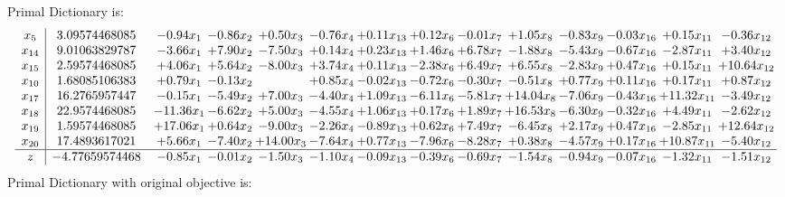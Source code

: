 \documentclass[8pt]{article}
\begin{document}
Primal Dictionary is:
\[\begin{array}{c| c c@{\hskip 2pt} c@{\hskip 2pt} c@{\hskip 2pt} c@{\hskip 2pt} c@{\hskip 2pt} c@{\hskip 2pt} c@{\hskip 2pt} c@{\hskip 2pt} c@{\hskip 2pt} c@{\hskip 2pt} c@{\hskip 2pt} c@{\hskip 2pt} }
 x_{5}   &  3.09574468085 & -0.94 x_{1} & -0.86 x_{2} & +  0.50 x_{3} & -0.76 x_{4} & +  0.11 x_{13} & +  0.12 x_{6} & -0.01 x_{7} & +  1.05 x_{8} & -0.83 x_{9} & -0.03 x_{16} & +  0.15 x_{11} & -0.36 x_{12}\\
 x_{14}   &  9.01063829787 & -3.66 x_{1} & +  7.90 x_{2} & -7.50 x_{3} & +  0.14 x_{4} & +  0.23 x_{13} & +  1.46 x_{6} & +  6.78 x_{7} & -1.88 x_{8} & -5.43 x_{9} & -0.67 x_{16} & -2.87 x_{11} & +  3.40 x_{12}\\
 x_{15}   &  2.59574468085 & +  4.06 x_{1} & +  5.64 x_{2} & -8.00 x_{3} & +  3.74 x_{4} & +  0.11 x_{13} & -2.38 x_{6} & +  6.49 x_{7} & +  6.55 x_{8} & -2.83 x_{9} & +  0.47 x_{16} & +  0.15 x_{11} & + 10.64 x_{12}\\
 x_{10}   &  1.68085106383 & +  0.79 x_{1} & -0.13 x_{2} &   & +  0.85 x_{4} & -0.02 x_{13} & -0.72 x_{6} & -0.30 x_{7} & -0.51 x_{8} & +  0.77 x_{9} & +  0.11 x_{16} & +  0.17 x_{11} & +  0.87 x_{12}\\
 x_{17}   &  16.2765957447 & -0.15 x_{1} & -5.49 x_{2} & +  7.00 x_{3} & -4.40 x_{4} & +  1.09 x_{13} & -6.11 x_{6} & -5.81 x_{7} & + 14.04 x_{8} & -7.06 x_{9} & -0.43 x_{16} & + 11.32 x_{11} & -3.49 x_{12}\\
 x_{18}   &  22.9574468085 & -11.36 x_{1} & -6.62 x_{2} & +  5.00 x_{3} & -4.55 x_{4} & +  1.06 x_{13} & +  0.17 x_{6} & +  1.89 x_{7} & + 16.53 x_{8} & -6.30 x_{9} & -0.32 x_{16} & +  4.49 x_{11} & -2.62 x_{12}\\
 x_{19}   &  1.59574468085 & + 17.06 x_{1} & +  0.64 x_{2} & -9.00 x_{3} & -2.26 x_{4} & -0.89 x_{13} & +  0.62 x_{6} & +  7.49 x_{7} & -6.45 x_{8} & +  2.17 x_{9} & +  0.47 x_{16} & -2.85 x_{11} & + 12.64 x_{12}\\
 x_{20}   &  17.4893617021 & +  5.66 x_{1} & -7.40 x_{2} & + 14.00 x_{3} & -7.64 x_{4} & +  0.77 x_{13} & -7.96 x_{6} & -8.28 x_{7} & +  0.38 x_{8} & -4.57 x_{9} & +  0.17 x_{16} & + 10.87 x_{11} & -5.40 x_{12}\\
\hline
z    &  -4.77659574468 & -0.85 x_{1} & -0.01 x_{2} & -1.50 x_{3} & -1.10 x_{4} & -0.09 x_{13} & -0.39 x_{6} & -0.69 x_{7} & -1.54 x_{8} & -0.94 x_{9} & -0.07 x_{16} & -1.32 x_{11} & -1.51 x_{12}\\
\end{array}\]
Primal Dictionary with original objective is:
\end{document}
